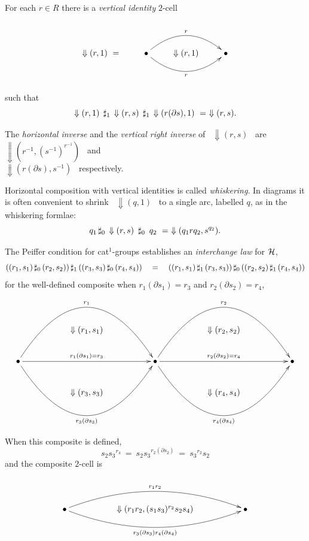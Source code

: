\medskip\noindent
For each $r \in R$ there is a \emph{vertical identity} $2$-cell 
$$
\xy
\xymatrix{
   & & & \\
 \Downarrow(r,1)~=
   & \bullet  \ar@/^5ex/[rr]^{r} 
             \ar@/_5ex/[rr]_{r} 
     & \Downarrow (r,1)
        & \bullet \\
   & & & \\
}
\endxy
$$
such that
$$
\Downarrow(r,1)\; \,\sharp_1\, \Downarrow(r,s)\; 
                  \,\sharp_1\, \Downarrow(r(\partial s),1)
~=~ \Downarrow(r,s).
$$

The \emph{horizontal inverse} and the 
\emph{vertical right inverse} of ~$\Downarrow(r,s)$~ 
are ~$\Downarrow(r^{-1},(s^{-1})^{r^{-1}})$~ and \\  
$\Downarrow(r(\partial s),s^{-1})$~ respectively.

Horizontal composition with vertical identities is called 
\emph{whiskering}. 
In diagrams it is often convenient to shrink ~$\Downarrow(q,1)$~ 
to a single arc, labelled $q$, as in the whiskering formlae:
$$
q_1 \,\sharp_0\, \Downarrow(r,s) ~\,\sharp_0\,~ q_2 
~=~ \Downarrow(q_1rq_2,{s}^{q_2}).
$$

\bigskip\noindent
The Peiffer condition for cat$^1$-groups establishes an 
  
\emph{interchange law} for $\mathcal{H}$,
$$
((r_1,s_1) \,\sharp_0\, (r_2,s_2)) \,\sharp_1\, ((r_3,s_3) \,\sharp_0\, (r_4,s_4))
\quad = \quad
((r_1,s_1) \,\sharp_1\, (r_3,s_3)) \,\sharp_0\, ((r_2,s_2) \,\sharp_1\, (r_4,s_4)) 
$$
for the well-defined composite 
when $r_1(\partial s_1) = r_3$ and $r_2(\partial s_2) = r_4$,
$$
\xy
\xymatrix{
  && && && && \\
  && \Downarrow (r_1,s_1)
     && && \Downarrow (r_2,s_2)
           && \\
  \bullet \ar@/^15ex/[rrrr]^{r_1} 
          \ar[rrrr]^{r_1(\partial s_1) = r_3}
          \ar@/_15ex/[rrrr]_{r_3(\partial s_3)} 
  && && \bullet \ar@/^15ex/[rrrr]^{r_2} 
                \ar[rrrr]^{r_2(\partial s_2) = r_4}
                \ar@/_15ex/[rrrr]_{r_4(\partial s_4)} 
        && && \bullet \\
  && \Downarrow (r_3,s_3)
     && && \Downarrow (r_4,s_4)
           && \\
  && && && && \\
}
\endxy
$$

\noindent
When this composite is defined, 
$$
    s_2{s_3}^{r_4}
~=~ s_2{s_3}^{r_2(\partial s_2)}
~=~ {s_3}^{r_2}s_2
$$
and the composite $2$-cell is
$$
\xy
\xymatrix{
   && && \\
   \bullet \ar@/^5ex/[rrrr]^{r_1r_2} 
           \ar@/_5ex/[rrrr]_{r_3(\partial s_3)r_4(\partial s_4)} 
   && \Downarrow (r_1r_2,(s_1s_3)^{r_2}s_2s_4)
      && \bullet \\
   && && \\
}
\endxy
$$

